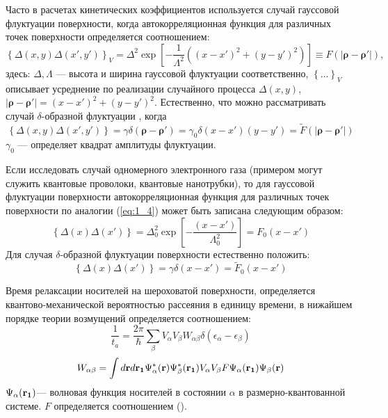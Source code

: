 Часто в расчетах кинетических коэффициентов используется случай гауссовой флуктуации поверхности, когда автокорреляционная функция для различных точек поверхности определяется соотношением:
\begin{equation}
\label{eq:1_4}
\left\{ \Delta(x,y)\Delta(x',y') \right\}_V = \Delta^2 \exp \left[ - \frac{1}{\Lambda^2} \left( (x-x')^2 +(y-y')^2 \right) \right] \equiv F \left( \left| \boldsymbol{\rho} - \boldsymbol{\rho'} \right| \right),
\end{equation}
здесь:
$\Delta, \Lambda$ --- высота и ширина гауссовой флуктуации соответственно, 
$\left\{ ... \right\}_V$
описывает усреднение по реализации случайного процесса 
$\Delta(x,y)$, $\left| \boldsymbol{\rho} - \boldsymbol{\rho'} \right| = (x-x')^2 + (y-y')^2$.
Естественно, что можно рассматривать случай $\delta$-образной флуктуации \cite{Lozovik1998}, когда
\begin{equation}
\label{eq:1_5}
\left\{ \Delta(x,y)\Delta(x',y') \right\} = \gamma\delta\left( \boldsymbol{\rho} - \boldsymbol{\rho'} \right) = \gamma_0\delta(x-x')(y-y')=\tilde{F} \left(\left| \boldsymbol{\rho} - \boldsymbol{\rho'} \right|\right)
\end{equation}
$\gamma_0$ --- определяет квадрат амплитуды флуктуации.

Если исследовать случай одномерного электронного газа (примером могут служить квантовые проволоки, квантовые нанотрубки), то для гауссовой флуктуации поверхности автокорреляционная функция для различных точек поверхности по аналогии (\ref{eq:1_4}) может быть записана следующим образом:
\begin{equation}
\label{eq:1_6}
\left\{\Delta(x)\Delta(x')\right\}=\Delta^2_0 \exp \left[-\frac{(x-x')}{\Lambda^2_0}\right] = F_0(x-x')
\end{equation}
Для случая $\delta$-образной флуктуации поверхности естественно положить:
\begin{equation}
\label{eq:1_7}
\left\{\Delta(x)\Delta(x')\right\}= \gamma\delta(x-x') = \tilde{F}_0(x-x')
\end{equation}

Время релаксации носителей на шероховатой поверхности, определяется квантово-механической вероятностью рассеяния в единицу времени, в нижайшем порядке теории возмущений определяется соотношением:
\begin{equation}
\frac{1}{t_a}=\frac{2\pi}{\hbar} \sum_\beta{V_\alpha V_\beta W_{\alpha\beta}\delta\left(\epsilon_\alpha-\epsilon_\beta\right)}
\end{equation}
\[
W_{\alpha\beta}=\int{d\boldsymbol{\mathbf{r}} d\boldsymbol{\mathbf{r_1}} \Psi^*_\alpha(\boldsymbol{\mathbf{r}}) \Psi^*_\beta(\boldsymbol{\mathbf{r_1}}) V_\alpha V_\beta F \Psi_\alpha(\boldsymbol{\mathbf{r_1}}) \Psi_\beta(\boldsymbol{\mathbf{r}})}
\]
$\Psi_\alpha(\boldsymbol{\mathbf{r_1}})$--- волновая функция носителей в состоянии $\alpha$ в размерно-квантованной системе. $F$ определяется соотношением ().

